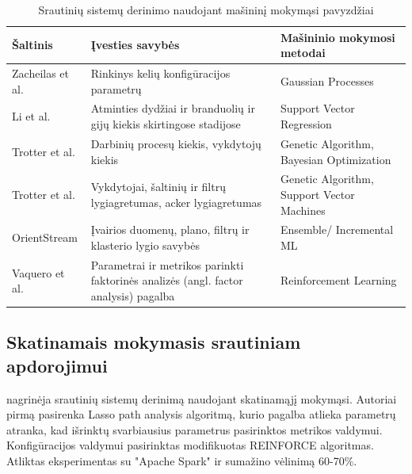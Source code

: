 \documentclass{VUMIFPSbakalaurinis}
\begin{document}
\begin{table}[H]
    \begin{tabular}{|l|p{}|p{}|}
    \hline
    Šaltinis                                        & Įvesties savybės                                                                    & Mašininio mokymosi metodai                 \\ \hline
    Zacheilas et al. \cite{zacheilas2015elastic}    & Rinkinys kelių konfigūracijos parametrų                                             & Gaussian Processes                         \\ \hline
    Li et al. \cite{li2016performance}              & Atminties dydžiai ir branduolių ir gijų kiekis skirtingose stadijose                & Support Vector Regression                  \\ \hline
    Trotter et al. \cite{Trotter2017Into}           & Darbinių procesų kiekis, vykdytojų kiekis                                           & Genetic Algorithm, Bayesian Optimization   \\ \hline
    Trotter et al. \cite{trotter2019forecasting}    & Vykdytojai, šaltinių ir filtrų lygiagretumas, acker lygiagretumas                   & Genetic Algorithm, Support Vector Machines \\ \hline
    OrientStream \cite{wang2017automating}          & Įvairios duomenų, plano, filtrų ir klasterio lygio savybės                          & Ensemble/ Incremental ML                    \\ \hline
    Vaquero et al. \cite{vaquero2018autotuning}     & Parametrai ir metrikos parinkti faktorinės analizės (angl. factor analysis) pagalba & Reinforcement Learning                     \\ \hline
    \end{tabular}
    \caption{Srautinių sistemų derinimo naudojant mašininį mokymąsi pavyzdžiai \cite{herodotou2020survey}}
    \label{ml-in-stream}
\end{table}

\subsection{Skatinamais mokymasis srautiniam apdorojimui}

\cite{vaquero2018autotuning} nagrinėja srautinių sistemų derinimą naudojant skatinamąjį mokymąsi. Autoriai pirmą pasirenka Lasso path analysis algoritmą, kurio pagalba atlieka parametrų atranka, kad išrinktų svarbiausius parametrus pasirinktos metrikos valdymui. Konfigūracijos valdymui pasirinktas modifikuotas REINFORCE algoritmas. Atliktas eksperimentas su "Apache Spark" ir sumažino vėlinimą 60-70\%.
\end{document}
